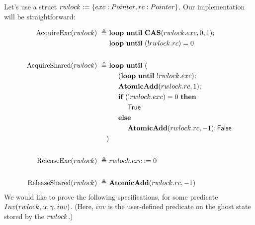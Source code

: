 \documentclass{article}
\newcommand{\true}{\textsf{True}}
\newcommand{\false}{\textsf{False}}
\renewcommand{\eqdef}{\triangleq}
\begin{document}
\newcommand{\langloop}{\textbf{loop}}
\newcommand{\until}{\textbf{until}}
\newcommand{\langif}{\textbf{if}}
\newcommand{\langthen}{\textbf{then}}
\newcommand{\langelse}{\textbf{else}}

\newcommand{\CAS}{\textbf{CAS}}
\newcommand{\AtomicAdd}{\textbf{AtomicAdd}}

\newcommand{\Inv}{Inv}
\newcommand{\inv}{inv}
\newcommand{\inlinehoare}[1]{{\color{blue}\left\{#1\right\}}}

Let's use a struct $rwlock := \{exc: Pointer, rc: Pointer\}$. Our implementation will be straightforward:

\begin{align*}
  \AcquireExc(\rwlock) ~\eqdef~
      & \langloop~\until~\CAS(\rwlock.\exc,0,1);\\
      & \langloop~\until~(!\rwlock.\rc) = 0\\
      \\
  \AcquireShared(\rwlock) ~\eqdef~
      & \langloop~\until~(\\
        & ~~~~ (\langloop~\until~!\rwlock.\exc);\\
        & ~~~~ \AtomicAdd(\rwlock.\rc, 1);\\
        & ~~~~ \langif~ (!\rwlock.\exc) = 0 ~\langthen\\
        & ~~~~~~~~ \true\\
        & ~~~~ \langelse\\
        & ~~~~~~~~ \AtomicAdd(\rwlock.\rc, -1); \false\\
      )\\
      \\
  \ReleaseExc(\rwlock) ~\eqdef~
      & \rwlock.\exc := 0\\
      \\
  \ReleaseShared(\rwlock) ~\eqdef~
      & \AtomicAdd(\rwlock.\rc, -1)
\end{align*}
We would like to prove the following specifications, for some predicate $\Inv(\rwlock,\alpha,\gamma,\inv)$. (Here, $\inv$ is the user-defined predicate on the ghost state stored by the $rwlock$.)
\end{document}
